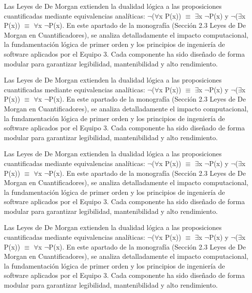 \documentclass[11pt,a4paper]{article}
\begin{document}
Las Leyes de De Morgan extienden la dualidad lógica a las proposiciones
cuantificadas mediante equivalencias analíticas: $ \lnot $($ \forall $x P(x)) $ \equiv $ $ \exists $x $ \lnot $P(x) y
$ \lnot $($ \exists $x P(x)) $ \equiv $ $ \forall $x $ \lnot $P(x). En este apartado de la monografía (Sección 2.3
Leyes de De Morgan en Cuantificadores), se analiza detalladamente el
impacto computacional, la fundamentación lógica de primer orden y los
principios de ingeniería de software aplicados por el Equipo 3. Cada
componente ha sido diseñado de forma modular para garantizar
legibilidad, mantenibilidad y alto rendimiento.

Las Leyes de De Morgan extienden la dualidad lógica a las proposiciones
cuantificadas mediante equivalencias analíticas: $ \lnot $($ \forall $x P(x)) $ \equiv $ $ \exists $x $ \lnot $P(x) y
$ \lnot $($ \exists $x P(x)) $ \equiv $ $ \forall $x $ \lnot $P(x). En este apartado de la monografía (Sección 2.3
Leyes de De Morgan en Cuantificadores), se analiza detalladamente el
impacto computacional, la fundamentación lógica de primer orden y los
principios de ingeniería de software aplicados por el Equipo 3. Cada
componente ha sido diseñado de forma modular para garantizar
legibilidad, mantenibilidad y alto rendimiento.

Las Leyes de De Morgan extienden la dualidad lógica a las proposiciones
cuantificadas mediante equivalencias analíticas: $ \lnot $($ \forall $x P(x)) $ \equiv $ $ \exists $x $ \lnot $P(x) y
$ \lnot $($ \exists $x P(x)) $ \equiv $ $ \forall $x $ \lnot $P(x). En este apartado de la monografía (Sección 2.3
Leyes de De Morgan en Cuantificadores), se analiza detalladamente el
impacto computacional, la fundamentación lógica de primer orden y los
principios de ingeniería de software aplicados por el Equipo 3. Cada
componente ha sido diseñado de forma modular para garantizar
legibilidad, mantenibilidad y alto rendimiento.

Las Leyes de De Morgan extienden la dualidad lógica a las proposiciones
cuantificadas mediante equivalencias analíticas: $ \lnot $($ \forall $x P(x)) $ \equiv $ $ \exists $x $ \lnot $P(x) y
$ \lnot $($ \exists $x P(x)) $ \equiv $ $ \forall $x $ \lnot $P(x). En este apartado de la monografía (Sección 2.3
Leyes de De Morgan en Cuantificadores), se analiza detalladamente el
impacto computacional, la fundamentación lógica de primer orden y los
principios de ingeniería de software aplicados por el Equipo 3. Cada
componente ha sido diseñado de forma modular para garantizar
legibilidad, mantenibilidad y alto rendimiento.
\end{document}
